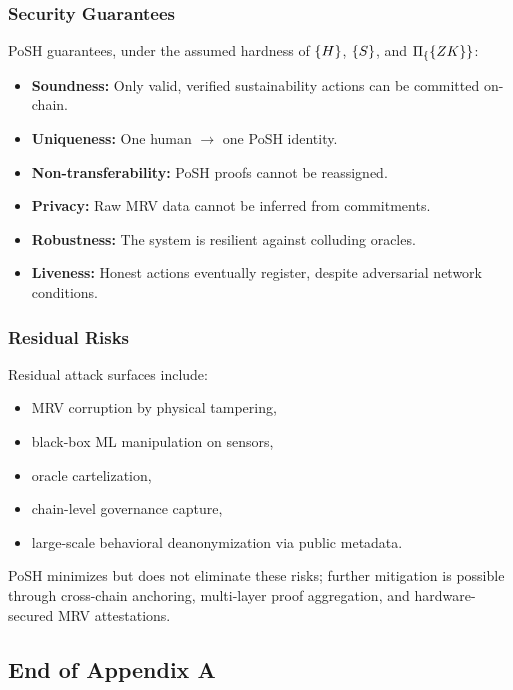 \documentclass{article}
\begin{document}
\subsubsection{Security Guarantees}

PoSH guarantees, under the assumed hardness of $\mathcal\{H\}$, $\mathcal\{S\}$,
and $\Pi_\{\textsf\{ZK\}\}$:

\begin{itemize}
\item \textbf{Soundness:} Only valid, verified sustainability actions can be
committed on-chain.
\item \textbf{Uniqueness:} One human $\rightarrow$ one PoSH identity.
\item \textbf{Non-transferability:} PoSH proofs cannot be reassigned.
\item \textbf{Privacy:} Raw MRV data cannot be inferred from commitments.
\item \textbf{Robustness:} The system is resilient against colluding oracles.
\item \textbf{Liveness:} Honest actions eventually register, despite adversarial
network conditions.
\end{itemize}

\subsubsection{Residual Risks}

Residual attack surfaces include:

\begin{itemize}
\item MRV corruption by physical tampering,
\item black-box ML manipulation on sensors,
\item oracle cartelization,
\item chain-level governance capture,
\item large-scale behavioral deanonymization via public metadata.
\end{itemize}

PoSH minimizes but does not eliminate these risks; further mitigation is
possible through cross-chain anchoring, multi-layer proof aggregation, and
hardware-secured MRV attestations.

\subsection{End of Appendix A}
\end{document}
